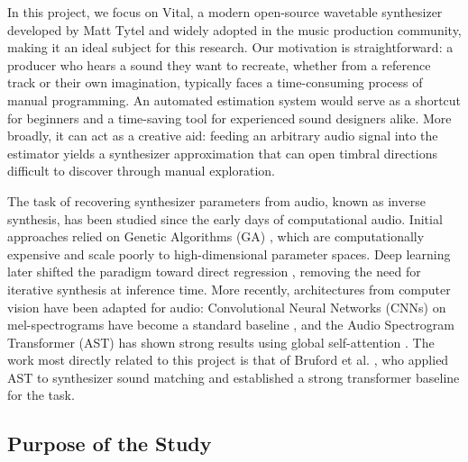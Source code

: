 \par \vspace{0.5cm}

\noindent In this project, we focus on Vital, a modern open-source wavetable synthesizer developed by Matt Tytel and widely adopted in the music production community, making it an ideal subject for this research. Our motivation is straightforward: a producer who hears a sound they want to recreate, whether from a reference track or their own imagination, typically faces a time-consuming process of manual programming. An automated estimation system would serve as a shortcut for beginners and a time-saving tool for experienced sound designers alike. More broadly, it can act as a creative aid: feeding an arbitrary audio signal into the estimator yields a synthesizer approximation that can open timbral directions difficult to discover through manual exploration.

\par \vspace{0.5cm}

\noindent The task of recovering synthesizer parameters from audio, known as inverse synthesis, has been studied since the early days of computational audio. Initial approaches relied on Genetic Algorithms (GA) \cite{walker2007audiosynthesis}, which are computationally expensive and scale poorly to high-dimensional parameter spaces. Deep learning later shifted the paradigm toward direct regression \cite{yeeking2018automatic, barkan2019inversynth}, removing the need for iterative synthesis at inference time. More recently, architectures from computer vision have been adapted for audio: Convolutional Neural Networks (CNNs) on mel-spectrograms have become a standard baseline \cite{hershey2017cnn}, and the Audio Spectrogram Transformer (AST) has shown strong results using global self-attention \cite{gong2021ast}. The work most directly related to this project is that of Bruford et al. \cite{bruford2024ast}, who applied AST to synthesizer sound matching and established a strong transformer baseline for the task.

\subsection{Purpose of the Study}

